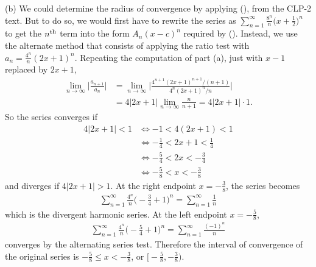 \begin{solution}
\noindent (b)
We could determine the radius of convergence by applying (), from the CLP-2 text.
But to do so,  we would first have to rewrite the series as 
$\sum_{n=1}^\infty \frac{8^n}{n}\big(x+\frac{1}{2}\big)^n$ to get the $n^{\rm th}$ term into the form 
$A_n (x-c)^n$ required by (). Instead, we use the alternate
method that consists of applying the ratio test with $a_n= \frac{4^n}{n}(2x+1)^n$.
Repeating the computation of part (a), just with $x-1$ replaced by $2x+1$, 
\begin{align*}
\lim_{n\to\infty} \bigg| \frac{a_{n+1}}{a_n} \bigg|
&= \lim_{n\to\infty} \bigg| \frac{4^{n+1}(2x+1)^{n+1}/(n+1)}{4^n(2x+1)^n/n} \bigg| \\
&= 4|2x+1| \lim_{n\to\infty} \frac{n}{n+1} = 4|2x+1|\cdot1.
\end{align*}
So the series converges if
\begin{align*}
4|2x+1|<1
&\iff -1<4(2x+1)<1 \\
&\iff -\frac{1}{4}<2x+1<\frac{1}{4} \\
&\iff -\frac{5}{4}<2x<-\frac{3}{4} \\
&\iff -\frac{5}{8}<x<-\frac{3}{8}
\end{align*}
and diverges if $4|2x+1|>1$.
At the right endpoint $x=-\frac{3}{8}$, the series becomes
\begin{align*}
\sum_{n=1}^\infty \frac{4^n}{n}\bigg( -\frac{3}{4}+1 \bigg)^n
= \sum_{n=1}^\infty \frac{1}{n}
\end{align*}
which is the divergent harmonic series. At the left endpoint $x=-\frac{5}{8}$,
\begin{align*}
\sum_{n=1}^\infty \frac{4^n}{n}\bigg( -\frac54+1 \bigg)^n = \sum_{n=1}^\infty \frac{(-1)^n}{n}
\end{align*}
converges by the alternating series test. Therefore the interval of convergence of the
original series is $-\frac{5}{8}\le x<-\frac{3}{8}$, or $\big[-\frac{5}{8},-\frac{3}{8}\big)$.


\end{solution}
